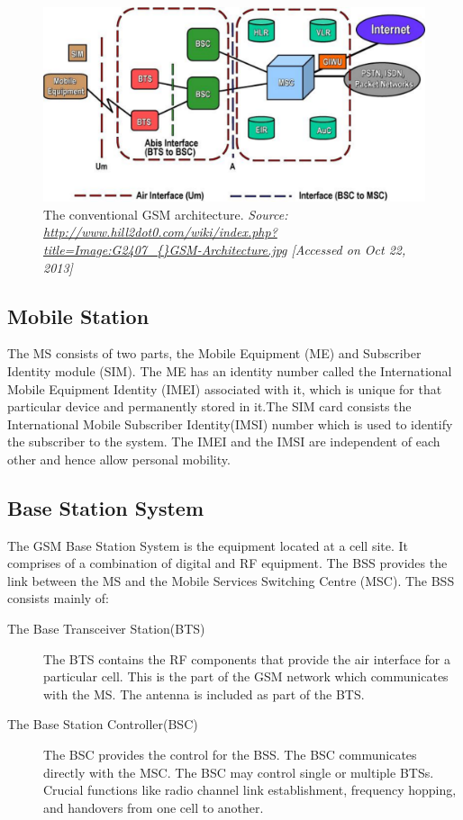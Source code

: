\begin{figure}[h]
\centering
\includegraphics[width=1\textwidth]{gsmArch}
\caption[The conventional GSM architecture]{The conventional GSM architecture.
\emph{Source:
\url{http://www.hill2dot0.com/wiki/index.php?title=Image:G2407\_{}GSM-Architecture.jpg} 
[Accessed on Oct 22, 2013]}}
\label{gsmArch}
\end{figure}

\subsection{Mobile Station}
The MS consists of two parts, the Mobile Equipment (ME) and Subscriber
Identity module (SIM). The ME has an identity number called the International
 Mobile Equipment Identity (IMEI) associated with it, which is unique for
that particular device and permanently stored in it.The SIM card consists
the International Mobile Subscriber Identity(IMSI) number which is used
to identify the subscriber to the system. The IMEI and the IMSI are independent
of each other and hence allow personal mobility.

\subsection{Base Station System}
The GSM Base Station System is the equipment located at a cell site. It
comprises of a combination of digital and RF equipment. The BSS provides
the link between the MS and the Mobile Services Switching Centre (MSC).
The BSS consists mainly of:
\begin{description}
\item[The Base Transceiver Station(BTS)]
The BTS contains the RF components that provide the air interface for
 a particular cell. This is the part of the GSM network which communicates
 with the MS. The antenna is included as part of the BTS.
\item[The Base Station Controller(BSC)]
The BSC provides the control for the BSS. The BSC communicates directly
with the MSC. The BSC may control single or multiple BTSs. Crucial functions
like radio channel link establishment, frequency hopping, and handovers from
one cell to another.

\end{description}


